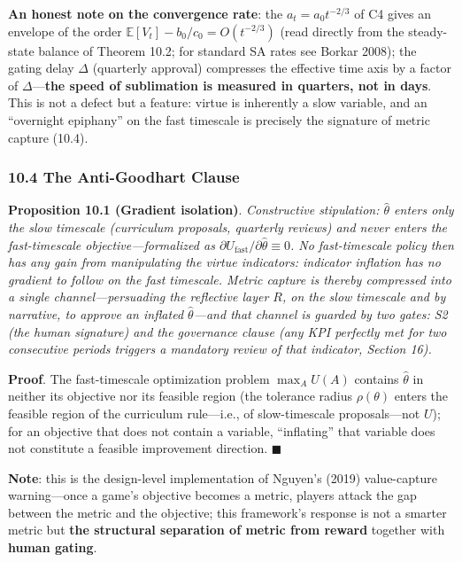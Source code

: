 \documentclass[
  11pt]{article}
\begin{document}
\textbf{An honest note on the convergence rate}: the
\(a_t = a_0 t^{-2/3}\) of C4 gives an envelope of the order
\(\mathbb{E}[V_t] - b_0/c_0 = O(t^{-2/3})\) (read directly from the
steady-state balance of Theorem 10.2; for standard SA rates see Borkar
2008); the gating delay \(\Delta\) (quarterly approval) compresses the
effective time axis by a factor of \(\Delta\)---\textbf{the speed of
sublimation is measured in quarters, not in days}. This is not a defect
but a feature: virtue is inherently a slow variable, and an ``overnight
epiphany'' on the fast timescale is precisely the signature of metric
capture (10.4).

\subsubsection{10.4 The Anti-Goodhart
Clause}\label{the-anti-goodhart-clause}

\textbf{Proposition 10.1 (Gradient isolation)}. \emph{Constructive
stipulation: \(\hat\theta\) enters only the slow timescale (curriculum
proposals, quarterly reviews) and never enters the fast-timescale
objective---formalized as
\(\partial U_{\mathrm{fast}}/\partial \hat\theta \equiv 0\). No
fast-timescale policy then has any gain from manipulating the virtue
indicators: indicator inflation has no gradient to follow on the fast
timescale. Metric capture is thereby compressed into a single
channel---persuading the reflective layer \(R\), on the slow timescale
and by narrative, to approve an inflated \(\hat\theta\)---and that
channel is guarded by two gates: S2 (the human signature) and the
governance clause (any KPI perfectly met for two consecutive periods
triggers a mandatory review of that indicator, Section 16).}

\textbf{Proof}. The fast-timescale optimization problem \(\max_A U(A)\)
contains \(\hat\theta\) in neither its objective nor its feasible region
(the tolerance radius \(\rho(\theta)\) enters the feasible region of the
curriculum rule---i.e., of slow-timescale proposals---not \(U\)); for an
objective that does not contain a variable, ``inflating'' that variable
does not constitute a feasible improvement direction. \(\blacksquare\)

\textbf{Note}: this is the design-level implementation of Nguyen's
(2019) value-capture warning---once a game's objective becomes a metric,
players attack the gap between the metric and the objective; this
framework's response is not a smarter metric but \textbf{the structural
separation of metric from reward} together with \textbf{human gating}.
\end{document}
